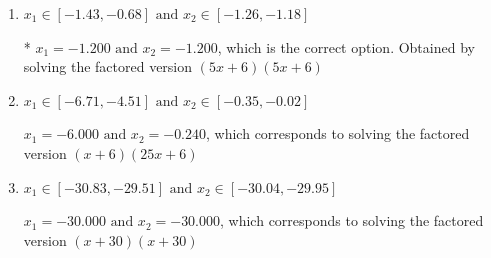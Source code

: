 \documentclass{extbook}[14pt]
\begin{document}
\begin{enumerate}
{\begin{enumerate}[label=\Alph*.]
$x_1 = -3.600 \text{ and } x_2 = -0.400$, which corresponds to solving the factored version $(5x + 18)(5x + 2)$
\item \( x_1 \in [-1.43, -0.68] \text{ and } x_2 \in [-1.26, -1.18] \)

* $x_1 = -1.200 \text{ and } x_2 = -1.200$, which is the correct option. Obtained by solving the factored version $(5x + 6)(5x + 6)$
\item \( x_1 \in [-6.71, -4.51] \text{ and } x_2 \in [-0.35, -0.02] \)

$x_1 = -6.000 \text{ and } x_2 = -0.240$, which corresponds to solving the factored version $(x + 6)(25x + 6)$
\item \( x_1 \in [-30.83, -29.51] \text{ and } x_2 \in [-30.04, -29.95] \)

$x_1 = -30.000 \text{ and } x_2 = -30.000$, which corresponds to solving the factored version $(x + 30)(x + 30)$
\end{enumerate}

}
\end{enumerate}
\end{document}
